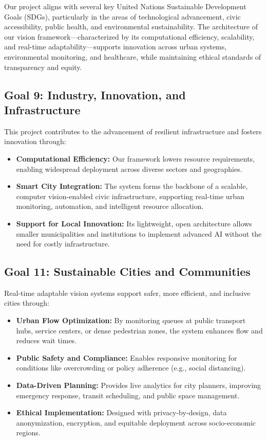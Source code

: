 \documentclass[11pt, a4paper]{article}
\theoremstyle{plain}
\begin{document}
Our project aligns with several key United Nations Sustainable Development Goals (SDGs), particularly in the areas of technological advancement, civic accessibility, public health, and environmental sustainability. The architecture of our vision framework—characterized by its computational efficiency, scalability, and real-time adaptability—supports innovation across urban systems, environmental monitoring, and healthcare, while maintaining ethical standards of transparency and equity.

\subsection*{Goal 9: Industry, Innovation, and Infrastructure}

This project contributes to the advancement of resilient infrastructure and fosters innovation through:

\begin{itemize}
    \item \textbf{Computational Efficiency:} Our framework lowers resource requirements, enabling widespread deployment across diverse sectors and geographies.
    \item \textbf{Smart City Integration:} The system forms the backbone of a scalable, computer vision-enabled civic infrastructure, supporting real-time urban monitoring, automation, and intelligent resource allocation.
    \item \textbf{Support for Local Innovation:} Its lightweight, open architecture allows smaller municipalities and institutions to implement advanced AI without the need for costly infrastructure.
\end{itemize}

\subsection*{Goal 11: Sustainable Cities and Communities}

Real-time adaptable vision systems support safer, more efficient, and inclusive cities through:

\begin{itemize}
    \item \textbf{Urban Flow Optimization:} By monitoring queues at public transport hubs, service centers, or dense pedestrian zones, the system enhances flow and reduces wait times.
    \item \textbf{Public Safety and Compliance:} Enables responsive monitoring for conditions like overcrowding or policy adherence (e.g., social distancing).
    \item \textbf{Data-Driven Planning:} Provides live analytics for city planners, improving emergency response, transit scheduling, and public space management.
    \item \textbf{Ethical Implementation:} Designed with privacy-by-design, data anonymization, encryption, and equitable deployment across socio-economic regions.
\end{itemize}
\end{document}
